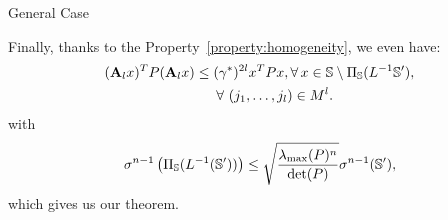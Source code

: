 \begin{subsection}{General Case}
\begin{pf}
Finally, thanks to the Property~\ref{property:homogeneity}, we even have:
\begin{equation}\label{eqn:P1}
\begin{aligned}
& (\mathbf{A}_l x)^T P (\mathbf{A}_l x) \leq (\gamma^*)^{2l} x^T P x,  \forall\, x \in \mathbb{S} \setminus \Pi_{\mathbb{S}}(L^{-1}\mathbb{S}'), \\
& \qquad \qquad \qquad \qquad \forall\ (j_1,\dots,j_l) \in M^l.
\end{aligned}
\end{equation}
with $$\sigma^{n-1} \left(  \Pi_{\mathbb{S}}(L^{-1}(\mathbb{S}')) \right) \leq \sqrt{\frac{\lambda_{\max}(P)^n}{\det(P)}}\sigma^{n-1}(\mathbb{S}'), $$ which gives us our theorem.


\end{pf}

\end{subsection}